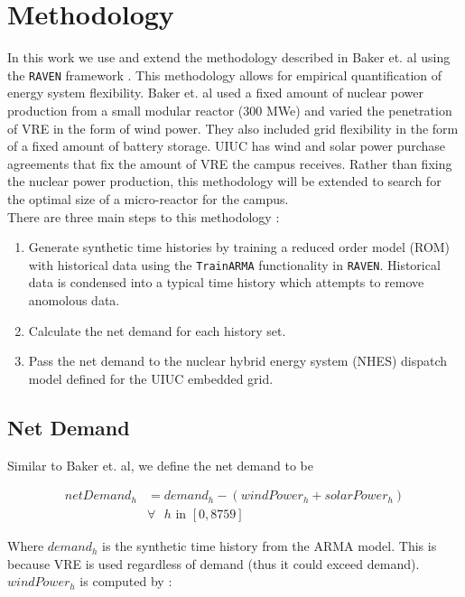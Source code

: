 \section{Methodology}

In this work we use and extend the methodology described in Baker et. al using the \texttt{RAVEN} framework \cite{baker_optimal_2018,alfonsi_raven_2016}. This methodology allows for empirical quantification of energy system flexibility. Baker et. al used a fixed amount of nuclear power production from a small modular reactor (300 MWe) and varied the penetration of VRE in the form of wind power. They also included grid flexibility in the form of a fixed amount of battery storage. UIUC has wind and solar power purchase agreements that fix the amount of VRE the campus receives. Rather than fixing the nuclear power production, this methodology will be extended to search for the optimal size of a micro-reactor for the campus. \\
There are three main steps to this methodology \cite{baker_optimal_2018}: 

\begin{enumerate}
	\item Generate synthetic time histories by training a reduced order model (ROM) with historical data using the \texttt{TrainARMA} functionality in \texttt{RAVEN}. Historical data is condensed into a typical time history which attempts to remove anomolous data.
	\item Calculate the net demand for each history set.
	\item Pass the net demand to the nuclear hybrid energy system (NHES) dispatch model defined for the UIUC embedded grid. 
\end{enumerate}

\subsection{Net Demand}
Similar to Baker et. al, we define the net demand to be 


\begin{equation}
	\begin{split}
		netDemand_h & = demand_h - (windPower_h + solarPower_h) \\ 
		& \text{$\forall$ $h$ in } [0,8759]
	\end{split}
\end{equation}

Where $demand_h$ is the synthetic time history from the ARMA model. This is because VRE is used regardless of demand (thus it could exceed demand). $windPower_h$ is computed by \cite{garcia_nuclear_2015}:


